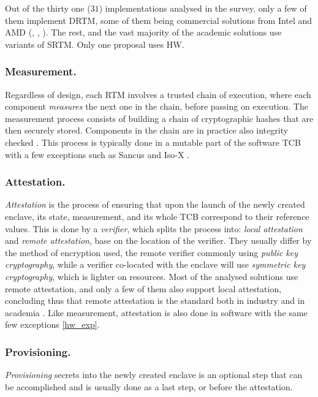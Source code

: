 \documentclass[runningheads,a4paper]{uwsese}
\begin{document}
Out of the thirty one ($31$) implementations analysed in the survey, only a few
of them implement DRTM, some of them being commercial solutions from Intel and
AMD (\cite{arm_tz}, \cite{intel_tdx}, \cite{intel_sgx}). The rest, and the
vast majority of the academic solutions use variants of SRTM. Only one proposal
uses HW.

\subsubsection{Measurement.}

Regardless of design, each RTM involves a trusted chain of execution, where
each component \emph{measures} the next one in the chain, before passing on
execution. The measurement process consists of building a chain of
cryptographic hashes that are then securely stored. Components in the chain are
in practice also integrity checked \cite{tee_hw_sup}. This process is typically
done in a mutable part of the software TCB with a few exceptions
\label{hw_exp} such as Sancus \cite{tee_sancus} and Iso-X
\cite{tee_isox}.

\subsubsection{Attestation.}

\emph{Attestation} is the process of ensuring that upon the launch of the newly
created enclave, its state, measurement, and its whole TCB correspond to their
reference values. This is done by a \emph{verifier}, which splits the process
into: \emph{local attestation} and \emph{remote attestation}, base on the
location of the verifier. They usually differ by the method of encryption used,
the remote verifier commonly using \emph{public key cryptography}, while a
verifier co-located with the enclave will use \emph{symmetric key
cryptography}, which is lighter on resources. Most of the analysed solutions
use remote attestation, and only a few of them also support local attestation,
concluding thus that remote attestation is the standard both in industry and in
academia \cite{tee_hw_sup}. Like measurement, attestation is also done in
software with the same few exceptions \ref{hw_exp}.

\subsubsection{Provisioning.}

\emph{Provisioning} secrets into the newly created enclave is an optional step
that can be accomplished and is usually done as a last step, or before the
attestation. \cite{tee_hw_sup}
\end{document}
